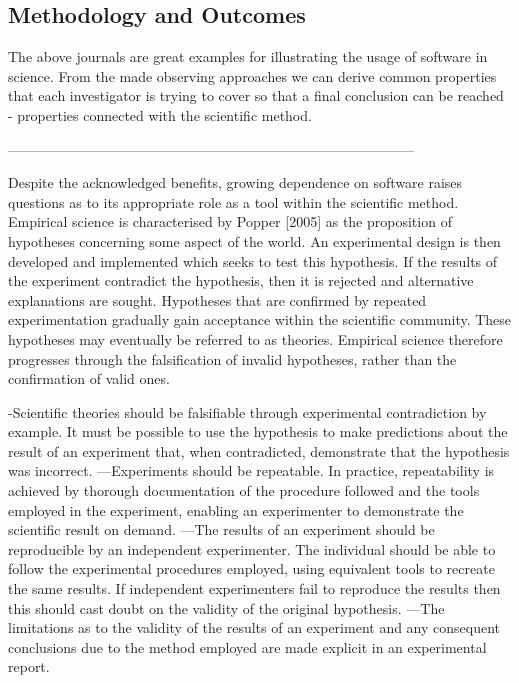 \subsection*{Methodology and Outcomes}



The above journals are great examples for illustrating the usage of software in science. From the made observing approaches we can derive common properties that each investigator is trying to cover so that a final conclusion can be reached - properties connected with the scientific method. 

---------------------------------------------------------------------------------------

Despite the acknowledged benefits, growing dependence on software raises questions
as to its appropriate role as a tool within the scientific method. Empirical science
is characterised by Popper [2005] as the proposition of hypotheses concerning some
aspect of the world. An experimental design is then developed and implemented which
seeks to test this hypothesis. If the results of the experiment contradict the hypothesis,
then it is rejected and alternative explanations are sought. Hypotheses that are
confirmed by repeated experimentation gradually gain acceptance within the scientific
community. These hypotheses may eventually be referred to as theories. Empirical science
therefore progresses through the falsification of invalid hypotheses, rather than
the confirmation of valid ones.


-Scientific theories should be falsifiable through experimental contradiction by example.
It must be possible to use the hypothesis to make predictions about the result of
an experiment that, when contradicted, demonstrate that the hypothesis was incorrect.
—Experiments should be repeatable. In practice, repeatability is achieved by thorough
documentation of the procedure followed and the tools employed in the experiment,
enabling an experimenter to demonstrate the scientific result on demand.
—The results of an experiment should be reproducible by an independent experimenter.
The individual should be able to follow the experimental procedures employed, using
equivalent tools to recreate the same results. If independent experimenters fail
to reproduce the results then this should cast doubt on the validity of the original
hypothesis.
—The limitations as to the validity of the results of an experiment and any consequent
conclusions due to the method employed are made explicit in an experimental report.



